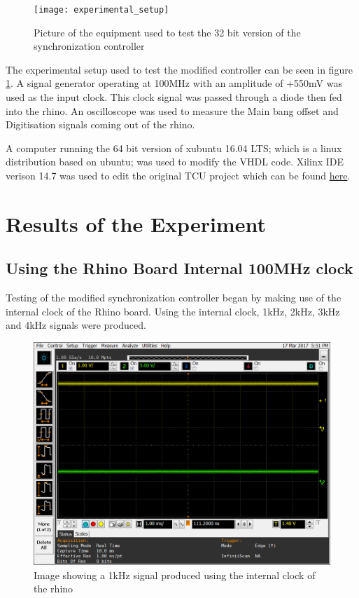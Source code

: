 \documentclass[12pt, a4paper]{article}
\begin{document}
	\begin{figure}[h]
		\centering
		\texttt{[image: experimental\_setup]}
		\caption{Picture of the equipment used to test the 32 bit version of the synchronization controller}
		\label{fig:exp_setup}
	\end{figure}
	

The experimental setup used to test the modified controller can be seen in figure \ref{fig:exp_setup}. A signal generator operating at 100MHz with an amplitude of +550mV was used as the input clock. This clock signal was passed through a diode then fed into the rhino. An oscilloscope was used to measure the Main bang offset and Digitisation signals coming out of the rhino. 

A computer running the 64 bit version of xubuntu 16.04 LTS; which is a linux distribution based on ubuntu; was used to modify the VHDL code. Xilinx IDE verison 14.7 was used to edit the original TCU  project which can be found \href{https://github.com/Skippy01/NeXtRAD-TCU/tree/master/NeXtRAD-TCU-Controller}{here}.



\section{Results of the Experiment}

\subsection{Using the Rhino Board Internal 100MHz clock}

Testing of the modified synchronization controller began by making use of the internal clock of the Rhino board. Using the internal clock, 1kHz, 2kHz, 3kHz and 4kHz signals were produced. 

	\begin{figure}[h!]
		\centering
		\includegraphics[width=13cm]{1khz_mb_offset_500_ns}
		\caption{Image showing a 1kHz signal produced using the internal clock of the rhino}
		\label{fig:1kHz_in_500_offset}
	\end{figure}
	
\end{document}
